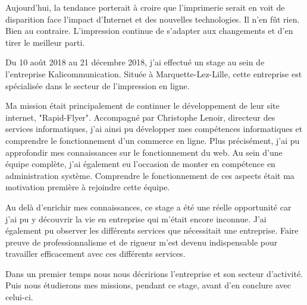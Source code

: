 Aujourd'hui, la tendance porterait à croire que l'imprimerie serait en voit de disparition face l'impact d'Internet et des nouvelles technologies. Il n'en fût rien. Bien au contraire. L'impression continue de s'adapter aux changements et d'en tirer le meilleur parti.\newline

Du 10 août 2018 au 21 décembre 2018, j'ai effectué un stage au sein de l'entreprise Kalicommunication.
Située à Marquette-Lez-Lille, cette entreprise est spécialisée dans le secteur de l'impression en ligne.

Ma mission était principalement de continuer le développement de leur site internet, "Rapid-Flyer".
Accompagné par Christophe Lenoir, directeur des services informatiques, j'ai ainsi pu développer mes compétences informatiques et comprendre le fonctionnement d'un commerce en ligne. Plus précisément, j'ai pu approfondir mes connaissances sur le fonctionnement du web. Au sein d'une équipe complète, j'ai également eu l'occasion de monter en compétence en administration système. Comprendre le fonctionnement de ces aspects était ma motivation première à rejoindre cette équipe.

Au delà d'enrichir mes connaissances, ce stage a été une réelle opportunité car j'ai pu y découvrir la vie en entreprise qui m'était encore inconnue. J'ai également pu observer les différents services que nécessitait une entreprise. Faire preuve de professionnalisme et de rigueur m'est devenu indispensable pour travailler efficacement avec ces différents services.\newline

Dans un premier temps nous nous décririons l'entreprise et son secteur d'activité. Puis nous étudierons mes missions, pendant ce stage, avant d'en conclure avec celui-ci.
